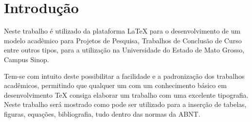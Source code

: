 \chapter*{Introdução}\label{chapter_introducao}
Neste trabalho é utilizado da plataforma LaTeX para o desenvolvimento de um modelo acadêmico para Projetos de Pesquisa, Trabalhos de Conclusão de Curso entre outros tipos, para a utilização na Universidade do Estado de Mato Grosso, Campus Sinop.

Tem-se com intuito deste possibilitar a facilidade e a padronização dos trabalhos acadêmicos, permitindo que qualquer um com um conhecimento básico em desenvolvimento TeX consiga elaborar um trabalho com uma excelente tipografia. Neste trabalho será mostrado como pode ser utilizado para a inserção de tabelas, figuras, equações, bibliografia, tudo dentro das normas da ABNT.

